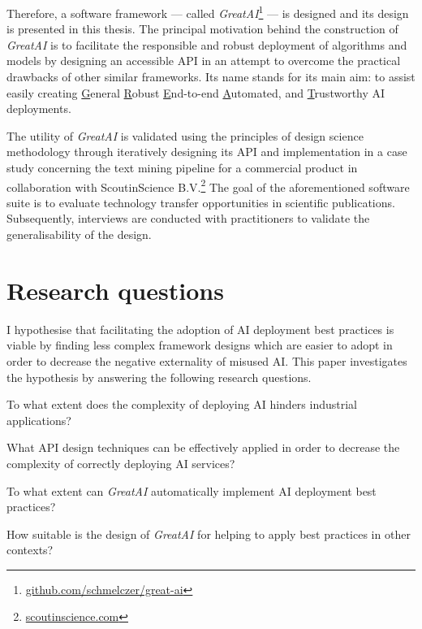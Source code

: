 Therefore, a software framework --- called \textit{GreatAI}\footnote{\href{https://github.com/schmelczer/great-ai}{github.com/schmelczer/great-ai}} --- is designed and its design is presented in this thesis. The principal motivation behind the construction of \textit{GreatAI} is to facilitate the responsible and robust deployment of algorithms and models by designing an accessible API in an attempt to overcome the practical drawbacks of other similar frameworks. Its name stands for its main aim: to assist easily creating \underline{G}eneral \underline{R}obust \underline{E}nd-to-end \underline{A}utomated, and \underline{T}rustworthy AI deployments.

The utility of \textit{GreatAI} is validated using the principles of design science methodology \cite{wieringa2014design} through iteratively designing its API and implementation in a case study concerning the text mining pipeline for a commercial product in collaboration with ScoutinScience B.V.\footnote{\href{https://scoutinscience.com/}{scoutinscience.com}} The goal of the aforementioned software suite is to evaluate technology transfer opportunities in scientific publications. Subsequently, interviews are conducted with practitioners to validate the generalisability of the design.

\section{Research questions}

I hypothesise that facilitating the adoption of AI deployment best practices is viable by finding less complex framework designs which are easier to adopt in order to decrease the negative externality of misused AI. This paper investigates the hypothesis by answering the following research questions. 

\begin{rqlist}
  \item To what extent does the complexity of deploying AI hinders industrial applications?
  \item What API design techniques can be effectively applied in order to decrease the complexity of correctly deploying AI services?
  \item To what extent can \textit{GreatAI} automatically implement AI deployment best practices?
  \item How suitable is the design of \textit{GreatAI} for helping to apply best practices in other contexts?
\end{rqlist}

